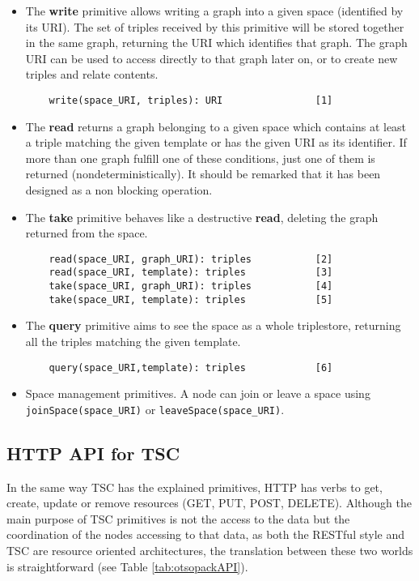 \begin{itemize}
 \item The \textbf{write} primitive allows writing a graph into a given space (identified by its URI). The set of
triples received by this primitive will be stored together in the same graph, returning the URI which identifies that
graph. The graph URI can be used to access directly to that graph later on, or to create new triples and relate
contents.

  \begin{lstlisting}
    write(space_URI, triples): URI                [1]
  \end{lstlisting}


  \item The \textbf{read} returns a graph belonging to a given space which contains at least a triple matching the given
template or has the given URI as its identifier. If more than one graph fulfill one of these conditions, just one of
them is returned (nondeterministically). It should be remarked that it has been designed as a non blocking operation.
  \item The \textbf{take} primitive behaves like a destructive \textbf{read}, deleting the graph returned from the
space.

  \begin{lstlisting}
    read(space_URI, graph_URI): triples           [2]
    read(space_URI, template): triples            [3]
    take(space_URI, graph_URI): triples           [4]
    take(space_URI, template): triples            [5]
  \end{lstlisting}


  \item The \textbf{query} primitive aims to see the space as a whole triplestore, returning all the triples matching
the given template.
  \begin{lstlisting}
    query(space_URI,template): triples            [6]
  \end{lstlisting}

  \item Space management primitives. A node can join or leave a space using \linebreak \texttt{joinSpace(space\_URI)} or
\texttt{leaveSpace(space\_URI)}.
\end{itemize}



\subsection{HTTP API for TSC}
In the same way TSC has the explained primitives, HTTP has verbs to get, create, update or remove resources (GET,
PUT, POST, DELETE). Although the main purpose of TSC primitives is not the access to the data but the coordination of
the nodes accessing to that data, as both the RESTful style and TSC are resource oriented architectures, the translation
between these two worlds is straightforward (see Table \ref{tab:otsopackAPI}).



